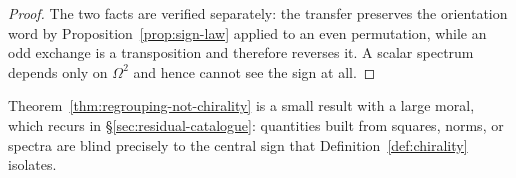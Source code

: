 \begin{proof}
The two facts are verified separately: the transfer preserves the orientation word by
Proposition~\ref{prop:sign-law} applied to an even permutation, while an odd exchange
is a transposition and therefore reverses it.  A scalar spectrum depends only on
$\Omega^{2}$ and hence cannot see the sign at all.
\end{proof}

\begin{remark}
Theorem~\ref{thm:regrouping-not-chirality} is a small result with a large moral, which
recurs in \S\ref{sec:residual-catalogue}: quantities built from squares, norms, or
spectra are blind precisely to the central sign that
Definition~\ref{def:chirality} isolates.
\end{remark}

